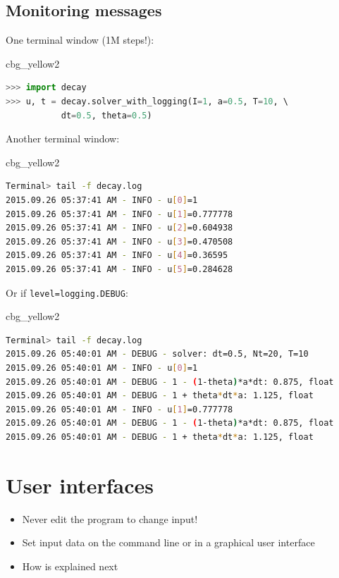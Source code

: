 \documentclass[%
oneside,                 %
final,                   %
10pt]{article}
\newenvironment{_cod_tight}[1]{
   \def\FrameCommand{\colorbox{#1}}
   \FrameRule0.6pt\MakeFramed {\FrameRestore}\vskip3mm}
   {\vskip0mm\endMakeFramed}
\newenvironment{cod}[1]{
\bgroup\rmfamily
\fboxsep=0mm\relax
\begin{_cod_tight}{#1}
\list{}{\parsep=-2mm\parskip=0mm\topsep=0pt\leftmargin=2mm
\rightmargin=2\leftmargin\leftmargin=4pt\relax}
\item\relax}
{\endlist\end{_cod_tight}\egroup}
\begin{document}
\subsection*{Monitoring messages}

One terminal window (1M steps!):

\begin{cod}{cbg_yellow2}\begin{lstlisting}[language=Python,style=simple,xleftmargin=2mm]
>>> import decay
>>> u, t = decay.solver_with_logging(I=1, a=0.5, T=10, \ 
           dt=0.5, theta=0.5)
\end{lstlisting}\end{cod}
\noindent

Another terminal window:

\begin{cod}{cbg_yellow2}\begin{lstlisting}[language=bash,style=simple,xleftmargin=2mm]
Terminal> tail -f decay.log
2015.09.26 05:37:41 AM - INFO - u[0]=1
2015.09.26 05:37:41 AM - INFO - u[1]=0.777778
2015.09.26 05:37:41 AM - INFO - u[2]=0.604938
2015.09.26 05:37:41 AM - INFO - u[3]=0.470508
2015.09.26 05:37:41 AM - INFO - u[4]=0.36595
2015.09.26 05:37:41 AM - INFO - u[5]=0.284628
\end{lstlisting}\end{cod}
\noindent

Or if \texttt{level=logging.DEBUG}:

\begin{cod}{cbg_yellow2}\begin{lstlisting}[language=bash,style=simple,xleftmargin=2mm]
Terminal> tail -f decay.log
2015.09.26 05:40:01 AM - DEBUG - solver: dt=0.5, Nt=20, T=10
2015.09.26 05:40:01 AM - INFO - u[0]=1
2015.09.26 05:40:01 AM - DEBUG - 1 - (1-theta)*a*dt: 0.875, float
2015.09.26 05:40:01 AM - DEBUG - 1 + theta*dt*a: 1.125, float
2015.09.26 05:40:01 AM - INFO - u[1]=0.777778
2015.09.26 05:40:01 AM - DEBUG - 1 - (1-theta)*a*dt: 0.875, float
2015.09.26 05:40:01 AM - DEBUG - 1 + theta*dt*a: 1.125, float
\end{lstlisting}\end{cod}
\noindent

\section*{User interfaces}
\label{decay:GUI}

\begin{itemize}
 \item Never edit the program to change input!

 \item Set input data on the command line or in a graphical user interface

 \item How is explained next
\end{itemize}
\end{document}
